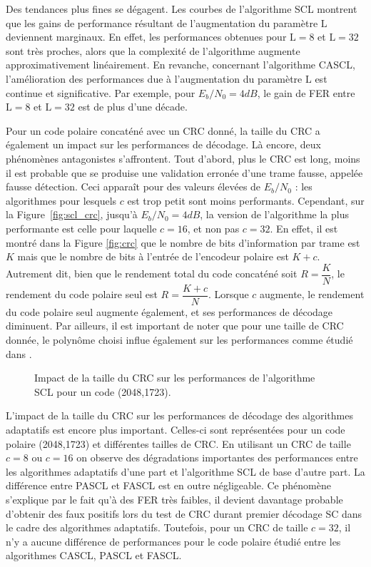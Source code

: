 Des tendances plus fines se dégagent. Les courbes de l'algorithme SCL montrent que les gains de performance résultant de l'augmentation du paramètre $\mathrm{L}$ deviennent marginaux. En effet, les performances obtenues pour $\mathrm{L}=8$ et $\mathrm{L}=32$ sont très proches, alors que la complexité de l'algorithme augmente approximativement linéairement. En revanche, concernant l'algorithme CASCL, l'amélioration des performances due à l'augmentation du paramètre $\mathrm{L}$ est continue et significative. Par exemple, pour $E_b/N_0=4dB$, le gain de FER entre $\mathrm{L}=8$ et $\mathrm{L}=32$ est de plus d'une décade.

Pour un code polaire concaténé avec un CRC donné, la taille du CRC a également un impact sur les performances de décodage. Là encore, deux phénomènes antagonistes s'affrontent. 
Tout d'abord, plus le CRC est long, moins il est probable que se produise une validation erronée d'une trame fausse, appelée fausse détection. Ceci apparaît pour des valeurs élevées de $E_b/N_0$ : les algorithmes pour lesquels $c$ est trop petit sont moins performants.
Cependant, sur la Figure~\ref{fig:scl_crc}, jusqu'à $E_b/N_0=4dB$, la version de l'algorithme la plus performante est celle pour laquelle $c=16$, et non pas $c=32$.
En effet, il est montré dans la Figure \ref{fig:crc} que le nombre de bits d'information par trame est $K$ mais que le nombre de bits à l'entrée de l'encodeur polaire est $K+c$. Autrement dit, bien que le rendement total du code concaténé soit $R=\dfrac{K}{N}$, le rendement du code polaire seul est $R=\dfrac{K+c}{N}$. Lorsque $c$ augmente, le rendement du code polaire seul augmente également, et ses performances de décodage diminuent. Par ailleurs, il est important de noter que pour une taille de CRC donnée, le polynôme choisi influe également sur les performances comme étudié dans \cite{zhang_crc_2017}.
\begin{figure}[t]
  \centering
  \caption{Impact de la taille du CRC sur les performances de l'algorithme SCL pour un code (2048,1723).}
\end{figure}

L'impact de la taille du CRC sur les performances de décodage des algorithmes adaptatifs est encore plus important. Celles-ci sont représentées pour un code polaire (2048,1723) et différentes tailles de CRC. En utilisant un CRC de taille $c=8$ ou $c=16$ on observe des dégradations importantes des performances entre les algorithmes adaptatifs d'une part et l'algorithme SCL de base d'autre part. La différence entre PASCL et FASCL est en outre négligeable. Ce phénomène s'explique par le fait qu'à des FER très faibles, il devient davantage probable d'obtenir des faux positifs lors du test de CRC durant premier décodage SC dans le cadre des algorithmes adaptatifs. Toutefois, pour un CRC de taille $c=32$, il n'y a aucune différence de performances pour le code polaire étudié entre les algorithmes CASCL, PASCL et FASCL.

